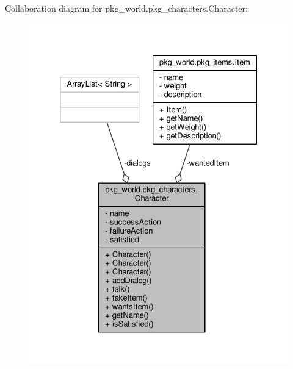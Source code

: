 Collaboration diagram for pkg\-\_\-world.\-pkg\-\_\-characters.\-Character\-:
\nopagebreak
\begin{figure}[H]
\begin{center}
\leavevmode
\includegraphics[width=327pt]{classpkg__world_1_1pkg__characters_1_1Character__coll__graph}
\end{center}
\end{figure}
